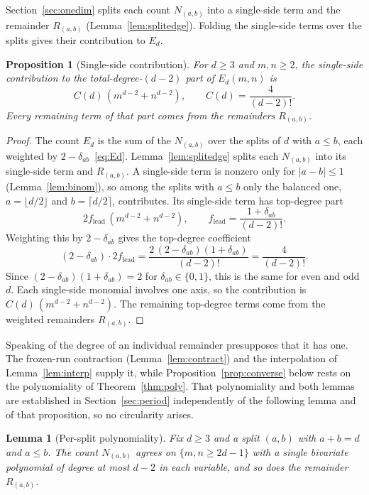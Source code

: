 \documentclass[11pt]{article}
\newtheorem{lemma}[theorem]{Lemma}
\newtheorem{proposition}[theorem]{Proposition}
\theoremstyle{definition}
\theoremstyle{remark}
\begin{document}
Section~\ref{sec:onedim} splits each count $N_{(a,b)}$ into a single-side term and the
remainder $R_{(a,b)}$ (Lemma~\ref{lem:splitedge}). Folding the single-side terms
over the splits gives their contribution to $E_d$.

\begin{proposition}[Single-side contribution]\label{prop:singleside}
For $d\ge3$ and $m,n\ge2$, the single-side contribution to the total-degree-$(d-2)$
part of $E_d(m,n)$ is
\[
  C(d)\,(m^{d-2}+n^{d-2}),\qquad C(d)=\frac{4}{(d-2)!}.
\]
Every remaining term of that part comes from the remainders $R_{(a,b)}$.
\end{proposition}

\begin{proof}
The count $E_d$ is the sum of the $N_{(a,b)}$ over the splits of $d$
with $a\le b$, each weighted by $2-\delta_{ab}$~\eqref{eq:Ed}. Lemma~\ref{lem:splitedge} splits each
$N_{(a,b)}$ into its single-side term and $R_{(a,b)}$. A single-side term is nonzero
only for $|a-b|\le1$ (Lemma~\ref{lem:binom}), so among the splits with $a\le b$ only the
balanced one, $a=\lfloor d/2\rfloor$ and $b=\lceil d/2\rceil$, contributes. Its
single-side term has top-degree part
\[
  2f_{\mathrm{lead}}\,(m^{d-2}+n^{d-2}),\qquad f_{\mathrm{lead}}=\frac{1+\delta_{ab}}{(d-2)!}.
\]
Weighting this by $2-\delta_{ab}$ gives the top-degree coefficient
\[
  (2-\delta_{ab})\cdot 2f_{\mathrm{lead}}
  =\frac{2\,(2-\delta_{ab})(1+\delta_{ab})}{(d-2)!}=\frac{4}{(d-2)!}.
\]
Since $(2-\delta_{ab})(1+\delta_{ab})=2$ for $\delta_{ab}\in\{0,1\}$, this is the same
for even and odd $d$. Each single-side monomial involves one axis, so the contribution
is $C(d)\,(m^{d-2}+n^{d-2})$. The remaining top-degree terms come from the weighted
remainders $R_{(a,b)}$.
\end{proof}

Speaking of the degree of an individual remainder presupposes that it has one.
The frozen-run contraction (Lemma~\ref{lem:contract}) and the interpolation of
Lemma~\ref{lem:interp} supply it, while Proposition~\ref{prop:converse} below rests on
the polynomiality of Theorem~\ref{thm:poly}. That polynomiality and both
lemmas are established in Section~\ref{sec:period} independently of the
following lemma and of that proposition, so no circularity arises.

\begin{lemma}[Per-split polynomiality]\label{lem:splitpoly}
Fix $d\ge3$ and a split $(a,b)$ with $a+b=d$ and $a\le b$. The count
$N_{(a,b)}$ agrees on $\{m,n\ge2d-1\}$
with a single bivariate polynomial of degree at most $d-2$ in each variable, and so does the remainder $R_{(a,b)}$.
\end{lemma}
\end{document}
